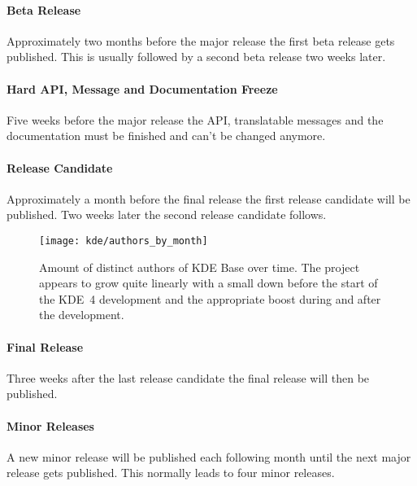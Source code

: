 \paragraph{Beta Release}

Approximately two months before the major release the first beta release gets
published. This is usually followed by a second beta release two weeks later.

\paragraph{Hard API, Message and Documentation Freeze}

Five weeks before the major release the \ac{API}, translatable messages and the
documentation must be finished and can't be changed anymore.

\paragraph{Release Candidate}

Approximately a month before the final release the first release candidate will
be published. Two weeks later the second release candidate follows.

\begin{figure}[htbp]
  \centering
  \texttt{[image: kde/authors\_by\_month]}
  \caption[Authors by Month, KDE]
  {Amount of distinct authors of KDE Base over time. The project appears to
    grow quite linearly with a small down before the start of the KDE~4
    development and the appropriate boost during and after the development.}
  \label{fig:kde:abm}
\end{figure}

\paragraph{Final Release}

Three weeks after the last release candidate the final release will then be
published.

\paragraph{Minor Releases}

A new minor release will be published each following month until the next major
release gets published. This normally leads to four minor releases.


